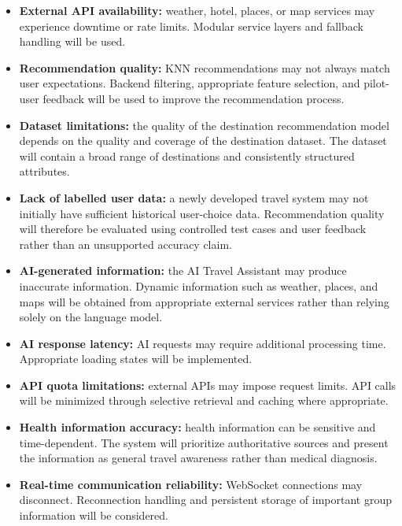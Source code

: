 \documentclass[11pt,a4paper]{article}
\begin{document}
\begin{itemize}

\item \textbf{External API availability:} weather, hotel, places, or map services may experience downtime or rate limits. Modular service layers and fallback handling will be used.

\item \textbf{Recommendation quality:} KNN recommendations may not always match user expectations. Backend filtering, appropriate feature selection, and pilot-user feedback will be used to improve the recommendation process.

\item \textbf{Dataset limitations:} the quality of the destination recommendation model depends on the quality and coverage of the destination dataset. The dataset will contain a broad range of destinations and consistently structured attributes.

\item \textbf{Lack of labelled user data:} a newly developed travel system may not initially have sufficient historical user-choice data. Recommendation quality will therefore be evaluated using controlled test cases and user feedback rather than an unsupported accuracy claim.

\item \textbf{AI-generated information:} the AI Travel Assistant may produce inaccurate information. Dynamic information such as weather, places, and maps will be obtained from appropriate external services rather than relying solely on the language model.

\item \textbf{AI response latency:} AI requests may require additional processing time. Appropriate loading states will be implemented.

\item \textbf{API quota limitations:} external APIs may impose request limits. API calls will be minimized through selective retrieval and caching where appropriate.

\item \textbf{Health information accuracy:} health information can be sensitive and time-dependent. The system will prioritize authoritative sources and present the information as general travel awareness rather than medical diagnosis.

\item \textbf{Real-time communication reliability:} WebSocket connections may disconnect. Reconnection handling and persistent storage of important group information will be considered.


\end{itemize}
\end{document}
